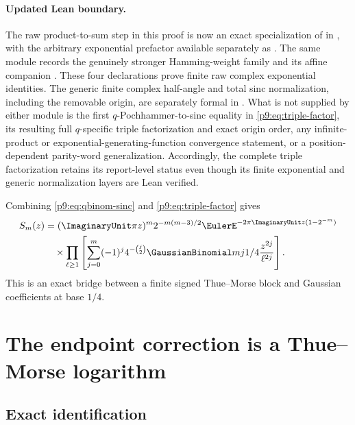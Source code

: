 \documentclass[11pt]{article}
\numberwithin{equation}{section}
\theoremstyle{definition}
\theoremstyle{remark}
\begin{document}
\paragraph{Updated Lean boundary.}
The raw product-to-sum step in this proof is now an exact specialization of
 in
, with the arbitrary exponential prefactor available
separately as .  The same module records
the genuinely stronger Hamming-weight family
 and its affine companion
.  These four declarations prove finite raw
complex exponential identities.  The generic finite complex half-angle and total sinc
normalization, including the removable origin, are separately formal in
.  What is not supplied by either module is the first
$q$-Pochhammer-to-sinc equality in \eqref{p9:eq:triple-factor}, its resulting full
$q$-specific triple factorization and exact origin order, any infinite-product or
exponential-generating-function convergence statement, or a position-dependent parity-word
generalization.  Accordingly, the complete triple factorization retains its report-level
status even though its finite exponential and generic normalization layers are Lean verified.

\begin{corollary}
Combining \eqref{p9:eq:qbinom-sinc} and \eqref{p9:eq:triple-factor} gives
\begin{align}
 S_m(z)
 &=(\ImaginaryUnit\pi z)^m2^{-m(m-3)/2}\EulerE^{-2\pi\ImaginaryUnit z(1-2^{-m})} \notag\\
 &\quad\times
 \prod_{\ell\ge1}
 \left[
  \sum_{j=0}^{m}(-1)^j4^{-\binom j2}\GaussianBinomial mj{1/4}
  \frac{z^{2j}}{\ell^{2j}}
 \right].                                                  \label{p9:eq:TM-qbinom}
\end{align}
This is an exact bridge between a finite signed Thue--Morse block and Gaussian
coefficients at base $1/4$.
\end{corollary}

\section{The endpoint correction is a Thue--Morse logarithm}
\label{p9:sec:endpoint-TM}

\subsection{Exact identification}
\end{document}
